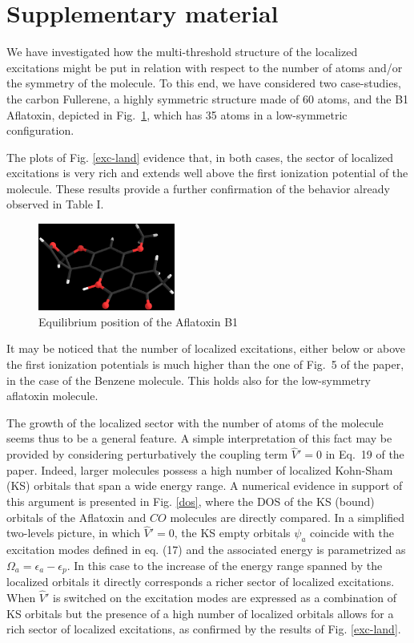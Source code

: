 \documentclass[11pt,a4paper]{article}
\newcommand{\op}[1]{\hat {#1}}
\begin{document}


\section*{Supplementary material}

We have investigated how the multi-threshold structure of the localized excitations might be put in relation with respect to
the number of atoms and/or the symmetry of the molecule. To this end, we have considered two case-studies, the carbon Fullerene, a highly symmetric structure made of 60 atoms, and the B1 Aflatoxin, depicted in Fig.~\ref{aflab1}, which has 35 atoms in a low-symmetric configuration.

The plots of Fig. \ref{exc-land} evidence that, in both cases, the sector of localized excitations is very rich and extends well above the first ionization potential of the molecule. These results provide a further confirmation of the behavior already observed in Table I.
\begin{figure}[h]
  \centering
  \includegraphics[width=0.4\textwidth]{AflaB1.eps}
    \caption{Equilibrium position of the Aflatoxin B1}
\label{aflab1}
\end{figure}

It may be noticed that the number of localized excitations, either below or above the first ionization potentials is much higher than
the one of Fig.~5 of the paper, in the case of the Benzene molecule. This holds also for the low-symmetry aflatoxin molecule.

The growth of the localized sector with the number of atoms of the molecule seems thus to be a general feature.
A simple interpretation of this fact may be provided by considering perturbatively the coupling term $\op V'=0$ in Eq.~19 of the paper.
Indeed, larger molecules possess a high number of localized Kohn-Sham (KS) orbitals that span a wide energy range.
A numerical evidence in support of this argument is presented in Fig. \ref{dos}, where the DOS of the KS (bound) orbitals of the Aflatoxin and $CO$ molecules are directly compared.
In a simplified two-levels picture, in which $\op V'=0$, the KS empty orbitals $\psi_a$ coincide with the excitation modes defined in eq. (17) and the associated energy is parametrized as $\Omega_a=\epsilon_a-\epsilon_p$. In this case to the increase of the energy range spanned by the localized orbitals it directly corresponds a richer sector of localized excitations.
When $\op V'$ is switched on the excitation modes are expressed as a combination of KS orbitals but the presence of a high number of localized orbitals allows for a rich sector of localized excitations, as confirmed by the results of Fig. \ref{exc-land}.
\end{document}
